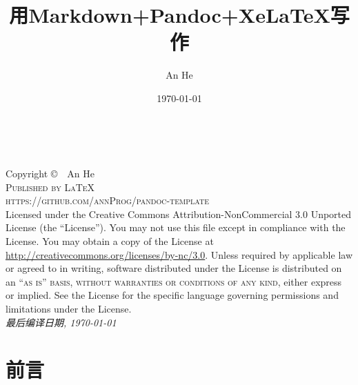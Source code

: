\documentclass[fancyhdr,bookmark]{ctexbook}
\title{用Markdown+Pandoc+XeLaTeX写作}
\author{An He}
\date{\today}
\begin{document}
\frontmatter

\begingroup
\thispagestyle{empty}
\vfill
\endgroup
{}

\newpage
~\vfill
\thispagestyle{empty}

\noindent Copyright \copyright\ \the\year\  An He\\ %

\noindent \textsc{Published by \LaTeX}\\ %
\noindent \textsc{https://github.com/annProg/pandoc-template}\\ %

\noindent Licensed under the Creative Commons Attribution-NonCommercial 3.0 Unported License (the ``License''). You may not use this file except in compliance with the License. You may obtain a copy of the License at \url{http://creativecommons.org/licenses/by-nc/3.0}. Unless required by applicable law or agreed to in writing, software distributed under the License is distributed on an \textsc{``as is'' basis, without warranties or conditions of any kind}, either express or implied. See the License for the specific language governing permissions and limitations under the License.\\ %

\noindent \textit{最后编译日期, \today\ \currenttime } %


\hypertarget{ux524dux8a00}{%
\chapter{前言}\label{ux524dux8a00}}
\end{document}
